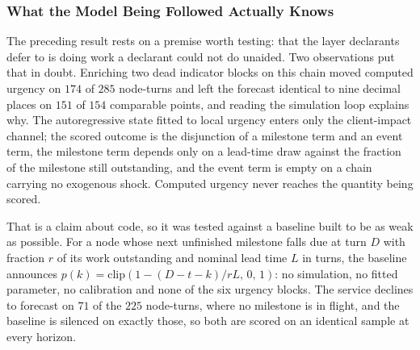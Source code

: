 \subsubsection{What the Model Being Followed Actually Knows}
\label{sec:res_trivial_baseline}

The preceding result rests on a premise worth testing: that the layer declarants defer to is
doing work a declarant could not do unaided. Two observations put that in doubt. Enriching two
dead indicator blocks on this chain moved computed urgency on $174$ of $285$ node-turns and
left the forecast identical to nine decimal places on $151$ of $154$ comparable points, and
reading the simulation loop explains why. The autoregressive state fitted to local urgency
enters only the client-impact channel; the scored outcome is the disjunction of a milestone
term and an event term, the milestone term depends only on a lead-time draw against the
fraction of the milestone still outstanding, and the event term is empty on a chain carrying no
exogenous shock. Computed urgency never reaches the quantity being scored.

That is a claim about code, so it was tested against a baseline built to be as weak as
possible. For a node whose next unfinished milestone falls due at turn $D$ with fraction $r$ of
its work outstanding and nominal lead time $L$ in turns, the baseline announces
$p(k) = \mathrm{clip}(1 - (D - t - k)/rL,\,0,\,1)$: no simulation, no fitted parameter, no
calibration and none of the six urgency blocks. The service declines to forecast on $71$ of the
$225$ node-turns, where no milestone is in flight, and the baseline is silenced on exactly
those, so both are scored on an identical sample at every horizon.

